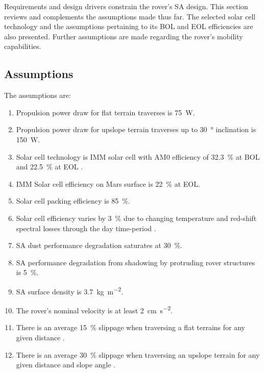 Requirements and design drivers constrain the rover's \ac{SA} design. This section reviews and complements the assumptions made thus far. The selected solar cell technology and the assumptions pertaining to its \ac{BOL} and \ac{EOL} efficiencies are also presented. Further assumptions are made regarding the rover's mobility capabilities.

\subsection{Assumptions}
\label{sec:RequirementsAndDesignDrivers:Assumptions}
The assumptions are:

\resetLeadingZeroCounter
\begin{enumerate}[leftmargin=1.31cm, label=\zeroLeadCounter{A}]
    \item Propulsion power draw for flat terrain traverses is \SI{75}{\watt}.
    \item Propulsion power draw for upslope terrain traverses up to \SI{30}{\degree} inclination is \SI{150}{\watt}.
    \item Solar cell technology is \ac{IMM} solar cell with AM0 efficiency of \SI{32.3}{\percent} at \ac{BOL} and \SI{22.5}{\percent} at \ac{EOL} .
    \item \label{itm:ass:solar_cell_efficiency} \ac{IMM} Solar cell efficiency on Mars surface is \SI{22}{\percent} at \ac{EOL}.
    \item \label{itm:ass:packing_efficiency} Solar cell packing efficiency is \SI{85}{\percent}.
    \item \label{itm:ass:red_shifts} Solar cell efficiency varies by \SI{3}{\percent} due to changing temperature and red-shift spectral losses through the day time-period .
    \item \label{itm:ass:dust_deposition_saturation} \ac{SA} dust performance degradation saturates at \SI{30}{\percent}.
    \item \label{itm:ass:protruding_shadowing} \ac{SA} performance degradation from shadowing by protruding rover structures is \SI{5}{\percent}.
    \item \label{itm:ass:sa_surface_density} \ac{SA} surface density is \SI{3.7}{kg.m^{-2}}.
    \item The rover's nominal velocity is at least \SI{2}{cm.s^{-2}}.
    \item There is an average \SI{15}{\percent} slippage when traversing a flat terrains for any given distance .
    \item There is an average \SI{30}{\percent} slippage when traversing an upslope terrain for any given distance and slope angle .
\end{enumerate}

